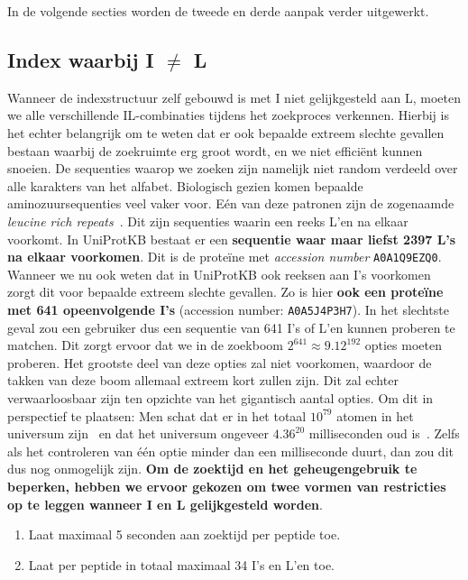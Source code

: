 In de volgende secties worden de tweede en derde aanpak verder uitgewerkt.

\subsection{Index waarbij I $\neq$ L}\label{subsec:index-waarbij-i-neq-l}
Wanneer de indexstructuur zelf gebouwd is met I niet gelijkgesteld aan L, moeten we alle verschillende IL-combinaties tijdens het zoekproces verkennen.
Hierbij is het echter belangrijk om te weten dat er ook bepaalde extreem slechte gevallen bestaan waarbij de zoekruimte erg groot wordt, en we niet efficiënt kunnen snoeien.
De sequenties waarop we zoeken zijn namelijk niet random verdeeld over alle karakters van het alfabet.
Biologisch gezien komen bepaalde aminozuursequenties veel vaker voor.
Eén van deze patronen zijn de zogenaamde \textit{leucine rich repeats}~\cite{leucine_rich_repeats}.
Dit zijn sequenties waarin een reeks L'en na elkaar voorkomt.
In UniProtKB bestaat er een \textbf{sequentie waar maar liefst 2397 L's na elkaar voorkomen}.
Dit is de proteïne met \textit{accession number} \texttt{A0A1Q9EZQ0}.
Wanneer we nu ook weten dat in UniProtKB ook reeksen aan I's voorkomen zorgt dit voor bepaalde extreem slechte gevallen.
Zo is hier \textbf{ook een proteïne met 641 opeenvolgende I's} (accession number: \texttt{A0A5J4P3H7}).
In het slechtste geval zou een gebruiker dus een sequentie van 641 I's of L'en kunnen proberen te matchen.
Dit zorgt ervoor dat we in de zoekboom $2^{641} \approx 9.12^{192}$ opties moeten proberen.
Het grootste deel van deze opties zal niet voorkomen, waardoor de takken van deze boom allemaal extreem kort zullen zijn.
Dit zal echter verwaarloosbaar zijn ten opzichte van het gigantisch aantal opties.
Om dit in perspectief te plaatsen: Men schat dat er in het totaal $10^{79}$ atomen in het universum zijn~\cite{atoms_in_universe} en dat het universum ongeveer $4.36^{20}$ milliseconden oud is~\cite{age_universe}.
Zelfs als het controleren van één optie minder dan een milliseconde duurt, dan zou dit dus nog onmogelijk zijn.
\textbf{Om de zoektijd en het geheugengebruik te beperken, hebben we ervoor gekozen om twee vormen van restricties op te leggen wanneer I en L gelijkgesteld worden}.
\begin{enumerate}
    \item Laat maximaal 5 seconden aan zoektijd per peptide toe.
    \item Laat per peptide in totaal maximaal 34 I's en L'en toe.
\end{enumerate}
